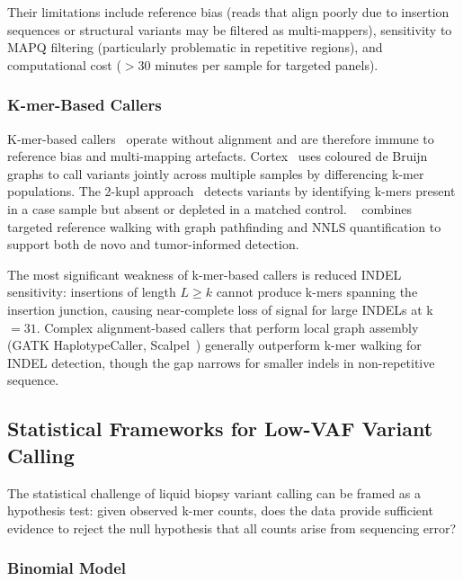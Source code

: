 Their limitations include reference bias (reads that align poorly due to
insertion sequences or structural variants may be filtered as multi-mappers),
sensitivity to MAPQ filtering (particularly problematic in repetitive regions),
and computational cost ($>30$ minutes per sample for targeted panels).

\subsubsection{K-mer-Based Callers}

K-mer-based callers~\cite{pelletier2021kupl,iqbal2012novo,denti2023kmerald,formenti2022merfin}
operate without alignment and are therefore immune to reference bias and
multi-mapping artefacts.  Cortex~\cite{iqbal2012novo} uses coloured de Bruijn
graphs to call variants jointly across multiple samples by differencing k-mer
populations.  The 2-kupl approach~\cite{pelletier2021kupl} detects variants by
identifying k-mers present in a case sample but absent or depleted in a
matched control.  \km{}~\cite{audoux2020km} combines targeted reference walking
with graph pathfinding and NNLS quantification to support both de novo and
tumor-informed detection.

The most significant weakness of k-mer-based callers is reduced INDEL
sensitivity: insertions of length $L \geq k$ cannot produce k-mers spanning
the insertion junction, causing near-complete loss of signal for large INDELs
at k$=31$.  Complex alignment-based callers that perform local graph assembly
(GATK HaplotypeCaller, Scalpel~\cite{narzisi2014accurate}) generally outperform
k-mer walking for INDEL detection, though the gap narrows for smaller indels
in non-repetitive sequence.

\subsection{Statistical Frameworks for Low-VAF Variant Calling}

The statistical challenge of liquid biopsy variant calling can be framed as a
hypothesis test: given observed k-mer counts, does the data provide sufficient
evidence to reject the null hypothesis that all counts arise from sequencing
error?

\subsubsection{Binomial Model}

